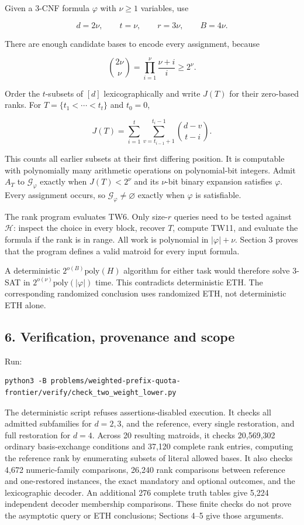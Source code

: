 Given a 3-CNF formula \(\varphi\) with \(\nu\ge1\) variables, use

\[
d=2\nu,\qquad t=\nu,\qquad r=3\nu,\qquad B=4\nu.
\tag{TW9}
\]

There are enough candidate bases to encode every assignment, because

\[
\binom{2\nu}{\nu}
=\prod_{i=1}^{\nu}\frac{\nu+i}{i}\ge2^\nu.
\tag{TW10}
\]

Order the \(t\)-subsets of \([d]\) lexicographically and write \(J(T)\) for their zero-based ranks. For \(T=\{t_1<\cdots<t_t\}\) and \(t_0=0\),

\[
J(T)=\sum_{i=1}^{t}\sum_{v=t_{i-1}+1}^{t_i-1}
\binom{d-v}{t-i}.
\tag{TW11}
\]

This counts all earlier subsets at their first differing position. It is computable with polynomially many arithmetic operations on polynomial-bit integers. Admit \(A_T\) to \(\mathcal G_\varphi\) exactly when \(J(T)<2^\nu\) and its \(\nu\)-bit binary expansion satisfies \(\varphi\). Every assignment occurs, so \(\mathcal G_\varphi\ne\varnothing\) exactly when \(\varphi\) is satisfiable.

The rank program evaluates TW6. Only size-\(r\) queries need to be tested against \(\mathcal H\): inspect the choice in every block, recover \(T\), compute TW11, and evaluate the formula if the rank is in range. All work is polynomial in \(|\varphi|+\nu\). Section 3 proves that the program defines a valid matroid for every input formula.

A deterministic \(2^{o(B)}\mathrm{poly}(H)\) algorithm for either task would therefore solve 3-SAT in \(2^{o(\nu)}\mathrm{poly}(|\varphi|)\) time. This contradicts deterministic ETH. The corresponding randomized conclusion uses randomized ETH, not deterministic ETH alone.

\hypertarget{af-e9b108715f-verification-provenance-and-scope}{%
\subsection{6. Verification, provenance and scope}\label{af-e9b108715f-verification-provenance-and-scope}}

Run:

\begin{verbatim}
python3 -B problems/weighted-prefix-quota-frontier/verify/check_two_weight_lower.py
\end{verbatim}

The deterministic script refuses assertions-disabled execution. It checks all admitted subfamilies for \(d=2,3\), and the reference, every single restoration, and full restoration for \(d=4\). Across 20 resulting matroids, it checks 20,569,302 ordinary basis-exchange conditions and 37,120 complete rank entries, computing the reference rank by enumerating subsets of literal allowed bases. It also checks 4,672 numeric-family comparisons, 26,240 rank comparisons between reference and one-restored instances, the exact mandatory and optional outcomes, and the lexicographic decoder. An additional 276 complete truth tables give 5,224 independent decoder membership comparisons. These finite checks do not prove the asymptotic query or ETH conclusions; Sections 4--5 give those arguments.

